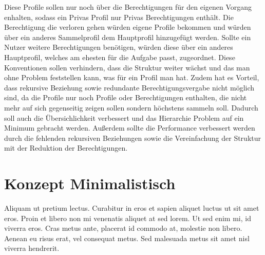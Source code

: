 Diese Profile sollen nur noch über die Berechtigungen für den eigenen Vorgang enhalten, sodass ein Privas Profil nur Privas Berechtigungen enthält.
Die Berechtigung die verloren gehen würden eigene Profile bekommen und würden über ein anderes Sammelprofil dem Hauptprofil hinzugefügt werden.
Sollte ein Nutzer weitere Berechtigungen benötigen, würden diese über ein anderes Hauptprofil, welches am ehesten für die Aufgabe passt, zugeordnet.
\newline
Diese Konventionen sollen verhindern, dass die Struktur weiter wächst und das man ohne Problem feststellen kann, was für ein Profil man hat.
Zudem hat es Vorteil, dass rekursive Beziehung sowie redundante Berechtigungsvergabe nicht möglich sind, da die Profile nur noch Profile oder Berechtigungen enthalten, die nicht mehr auf sich gegenseitig zeigen sollen sondern höchstens sammeln soll.
Dadurch soll auch die Übersichlichkeit verbessert und das Hierarchie Problem auf ein Minimum gebracht werden.
Außerdem sollte die Performance verbessert werden durch die fehlenden rekursiven Beziehungen sowie die Vereinfachung der Struktur mit der Reduktion der Berechtigungen.

\section{Konzept Minimalistisch}
\label{sec:chapter04:minimal}
Aliquam ut pretium lectus. Curabitur in eros et sapien aliquet luctus ut sit amet eros. Proin et libero non mi venenatis aliquet at sed lorem. Ut sed enim mi, id viverra eros. Cras metus ante, placerat id commodo at, molestie non libero. Aenean eu risus erat, vel consequat metus. Sed malesuada metus sit amet nisl viverra hendrerit.



